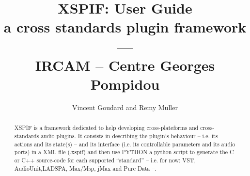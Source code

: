 \documentclass[12pt,a4paper]{report}
\title{ \textbf{XSPIF: User Guide}\\
\large a cross standards plugin framework\\
---\\
IRCAM -- Centre Georges Pompidou}
\author{Vincent Goudard and Remy Muller}
\newif\ifpdf
\begin{document}
\ifpdf
\DeclareGraphicsExtensions{.pdf, .jpg, .tif}
\else
{}
\fi

\maketitle

\tableofcontents

\newpage
\begin{abstract}
XSPIF is a framework dedicated to help developing
cross-plateforms and cross-standards audio plugins. It consists in describing the plugin's behaviour -- i.e. its actions and
its state(s) -- and its interface (i.e. its controllable parameters and its
audio ports) in a XML file (.xspif) and then use PYTHON a python
script to generate the C or C++ source-code for each supported
``standard'' -- i.e. for now: VST, AudioUnit,LADSPA, Max/Msp, jMax and Pure Data --.   
\end{abstract}
\newpage







\cleardoublepage


\end{document}
